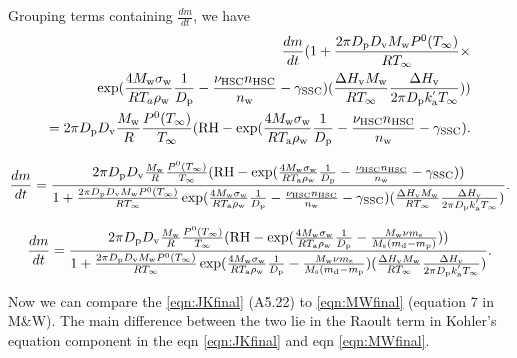 \documentclass[12pt]{article}
\begin{document}
Grouping terms containing $\frac{dm}{dt}$, we have  
\begin{eqnarray}\label{eqn:52}
\frac{dm}{dt}(1+\frac{2 \pi D_{\rm p} D_{\rm v} M_{\rm w} P^{\rm 0}(T_{\infty})}{R T_{\infty}} \times \\  \nonumber
\exp(\frac{4 M_{\rm w}\sigma_{\rm w}}{R T_{a} \rho_{\rm w}} \frac{1}{D_{\rm p}}- \frac{\nu_{\rm HSC}n_{\rm HSC}} {n_{\rm w}}-\gamma_{\rm SSC})(\frac{\Delta H_{\rm v} M_{\rm w}} {R T_{\infty}}\frac{\Delta H_{\rm v}}{2 \pi D_{\rm p} k^{'}_{\rm a} T_{\infty}})) \\  \nonumber
=2 \pi D_{\rm p} D_{\rm v}  \frac{M_{\rm w}}{R} \frac{P^{\rm 0}(T_{\infty})} {T_{\infty}} 
(\textrm{RH}-\exp( \frac{4 M_{\rm w}\sigma_{\rm w}}{R T_{\rm a} \rho_{\rm w}}\frac{1}{D_{\rm p}}-\frac{\nu_{\rm HSC}n_{\rm HSC}}{n_{\rm w}}-\gamma_{\rm SSC}). \nonumber
\end{eqnarray}

\begin{equation}\label{eqn:JKfinal}
\frac{dm}{dt}= \frac{2 \pi D_{\rm p} D_{\rm v}  \frac{M_{\rm w}}{R} \frac{P^{\rm 0}(T_{\infty})} {T_{\infty}} 
(\textrm{RH} - \exp(\frac{4 M_{\rm w}\sigma_{\rm w}}{R T_{\rm a} \rho_{\rm w}} \frac{1}{D_{\rm p}}- \frac{\nu_{\rm HSC}n_{\rm HSC}} {n_{\rm w}}-\gamma_{\rm SSC}))}{1+\frac{2 \pi D_{\rm p} D_{\rm v} M_{\rm w} P^{\rm 0}(T_{\infty})}{R T_{\infty}} \exp(\frac{4 M_{\rm w}\sigma_{\rm w}}{R T_{\rm a} \rho_{\rm w}} \frac{1}{D_{\rm p}}- \frac{\nu_{\rm HSC}n_{\rm HSC}} {n_{\rm w}}-\gamma_{\rm SSC})(\frac{\Delta H_{\rm v} M_{\rm w}} {R T_{\infty}}\frac{\Delta H_{\rm v}}{2 \pi D_{\rm p} k^{'}_{\rm a} T_{\infty}})}. 
\end{equation}


\begin{equation}\label{eqn:MWfinal}
\frac{dm}{dt}= \frac{2 \pi D_{\rm p} D_{\rm v}  \frac{M_{\rm w}}{R} \frac{P^{\rm 0}(T_{\infty})} {T_{\infty}} 
(\textrm{RH} - \exp( \frac{4 M_{\rm w}\sigma_{\rm w}}{R T_{\rm a} \rho_{\rm w}} 
\frac{1}{D_{\rm p}}-\frac{ M_{\rm w} \nu m_{\rm s}}{M_{\rm s} (m_{\rm d}-m_{\rm p})}))}{1+\frac{2 \pi D_{\rm p} D_{\rm v} M_{\rm w} P^{\rm 0}(T_{\infty})}{R T_{\infty}} \exp(\frac{4 M_{\rm w}\sigma_{\rm w}}{R T_{\rm a} \rho_{\rm w}}\frac{1}{D_{\rm p}}-\frac{ M_{\rm w} \nu m_{\rm s}}{M_{\rm s} (m_{\rm d}-m_{\rm p}}) (\frac{\Delta H_{\rm v} M_{\rm w}} {R T_{\infty}}\frac{\Delta H_{\rm v}}{2 \pi D_{\rm p} k^{'}_{\rm a} T_{\infty}})}. 
\end{equation}

Now we can compare the \ref{eqn:JKfinal} (A5.22) to \ref{eqn:MWfinal} (equation 7 in M\&W). The main difference between the two lie in the Raoult term in Kohler's equation component in the eqn \ref{eqn:JKfinal} and eqn \ref{eqn:MWfinal}. 
\end{document}
